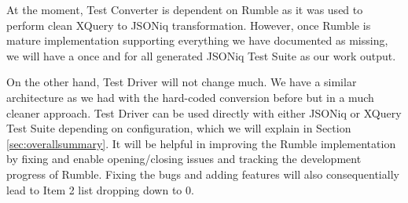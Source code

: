 

At the moment, Test Converter is dependent on Rumble as it was used to perform clean XQuery to JSONiq transformation. However, once Rumble is mature implementation supporting everything we have documented as missing, we will have a once and for all generated JSONiq Test Suite as our work output. 

On the other hand, Test Driver will not change much. We have a similar architecture as we had with the hard-coded conversion before but in a much cleaner approach. Test Driver can be used directly with either JSONiq or XQuery Test Suite depending on configuration, which we will explain in Section \ref{sec:overallsummary}. It will be helpful in  improving the Rumble implementation by fixing and enable opening/closing issues and tracking the development progress of Rumble. Fixing the bugs and adding features will also consequentially lead to Item 2 list dropping down to 0. 
